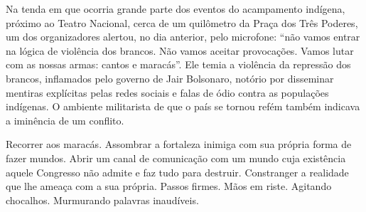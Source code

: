 Na tenda em que ocorria grande parte dos eventos do acampamento
indígena, próximo ao Teatro Nacional, cerca de um quilômetro da Praça
dos Três Poderes, um dos organizadores alertou, no dia anterior, pelo
microfone: ``não vamos entrar na lógica de violência dos brancos. Não
vamos aceitar provocações. Vamos lutar com as nossas armas: cantos e
maracás''. Ele temia a violência da repressão dos brancos, inflamados
pelo governo de Jair Bolsonaro, notório por disseminar mentiras
explícitas pelas redes sociais e falas de ódio contra as populações
indígenas. O ambiente militarista de que o país se tornou refém também
indicava a iminência de um conflito.

Recorrer aos maracás. Assombrar a fortaleza inimiga com sua própria
forma de fazer mundos. Abrir um canal de comunicação com um mundo cuja
existência aquele Congresso não admite e faz tudo para destruir. Constranger a realidade que lhe ameaça
com a sua própria. Passos firmes. Mãos em riste. Agitando chocalhos.
Murmurando palavras inaudíveis.

\pagebreak
\blankpage
